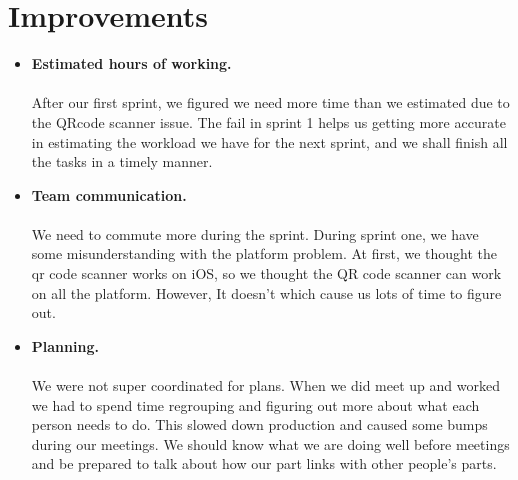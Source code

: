 \documentclass[12pt]{article}
\begin{document}
\section{Improvements}
\begin{itemize}
\item \textbf{Estimated hours of working.} \\ \\
After our first sprint, we figured we need more time than we estimated due to the QRcode scanner issue. The fail in sprint 1 helps us getting more accurate in estimating the workload we have for the next sprint, and we shall finish all the tasks in a timely manner.

\item \textbf{Team communication.} \\ \\
We need to commute more during the sprint. During sprint one, we have some misunderstanding with the platform problem. At first, we thought the qr code scanner works
on iOS, so we thought the QR code scanner can work on all the platform. However, It doesn't which cause us lots of time to figure out.

\item \textbf{Planning.} \\ \\
We were not super coordinated for plans. When we did meet up and worked we had to spend time regrouping and figuring out more about what each person needs to do. This slowed down production and caused some bumps during our meetings. We should know what we are doing well before meetings and be prepared to talk about how our part links with other people’s parts.
\end{itemize}
\end{document}
